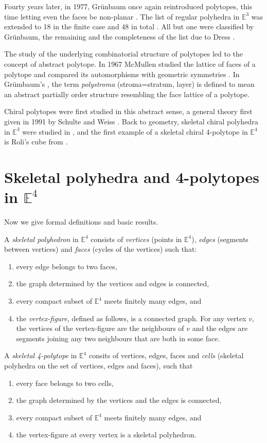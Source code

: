 \documentclass{article}
\theoremstyle{definition}
\newcommand{\E}{\mathbb{E}}
\begin{document}
	Fourty years later, in 1977, Grünbaum once again reintroduced polytopes, this time letting even the faces be non-planar \cite{grunbaum}. The list of regular polyhedra in $\E^3$ was extended to 18 in the finite case and 48 in total \cite{regular-ordinary}. All but one were classified by Grünbaum, the remaining and the completeness of the list due to Dress \cite{Dress1981,Dress1985}.
	
	The study of the underlying combinatorial structure of polytopes led to the concept of abstract polytope. In 1967 McMullen studied the lattice of faces of a polytope and compared its automorphisms with geometric symmetries \cite{mcmullen-combinatorially}. In Grümbaum's \cite{grunbaum-regularity}, the term \textit{polystroma} (stroma=stratum, layer) is defined to mean an abstract partially order structure resembling the face lattice of a polytope.
	
	Chiral polytopes were first studied in this abstract sense, a general theory first given in 1991 by Schulte and Weiss \cite{schulte-chiral}. Back to geometry, skeletal chiral polyhedra in $\E^3$ were studied in \cite{chiral-polyhedra-i,chiral-polyhedra-ii}, and the first example of a skeletal chiral 4-polytope in $\E^4$ is Roli's cube from \cite{rolis-cube}.
	
	\section{Skeletal polyhedra and 4-polytopes in $\E^4$}\label{sec:skeletal}
	Now we give formal definitions and basic results.
	
	A \textit{skeletal polyhedron} in $\E^4$ consists of \textit{vertices} (points in $\E^4$), \textit{edges} (segments between vertices) and \textit{faces} (cycles of the vertices) such that:
	\begin{enumerate}[\itshape(i)]
		\item every edge belongs to two faces,
		\item the graph determined by the vertices and edges is connected,
		\item every compact subset of $\E^4$ meets finitely many edges, and
		\item the \textit{vertex-figure}, defined as follows, is a connected graph. For any vertex $v$, the vertices of the vertex-figure are the neighbours of $v$ and the edges are segments joining any two neighbours that are both in some face.
	\end{enumerate}
	A \textit{skeletal 4-polytope} in $\E^4$ consits of vertices, edges, faces and \textit{cells} (skeletal polyhedra on the set of vertices, edges and faces), such that
	\begin{enumerate}[\itshape(i)]
		\item every face belongs to two cells,
		\item the graph determined by the vertices and the edges is connected,
		\item every compact subset of $\E^4$ meets finitely many edges, and
		\item the vertex-figure at every vertex is a skeletal polyhedron.
		\end{enumerate}
	
\end{document}
